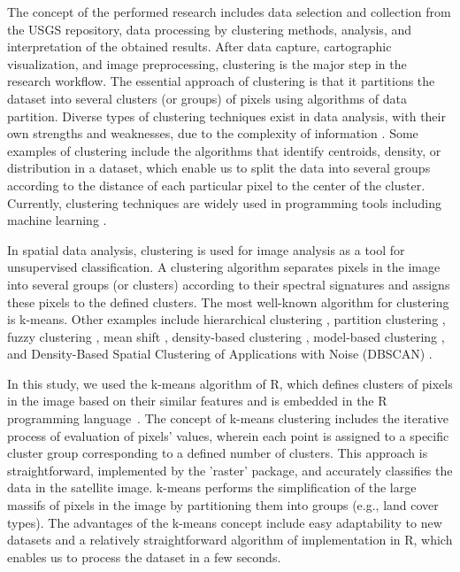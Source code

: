 \documentclass[information,article,accept,pdftex,moreauthors]{Definitions/mdpi}
\begin{document}
{The concept of the performed research includes data selection and collection from the USGS repository, data processing by clustering methods, analysis, and interpretation of the obtained results. After data capture, cartographic visualization, and image preprocessing, clustering is the major step in the research workflow. The essential approach of clustering is that it partitions the dataset into several clusters (or groups) of pixels using algorithms of data partition. Diverse types of clustering techniques exist in data analysis, with their own strengths and weaknesses, due to the complexity of information} \cite{XuTian}. {Some examples of clustering include the algorithms that identify centroids, density, or distribution in a dataset, which enable us to split the data into several groups according to the distance of each particular pixel to the center of the cluster. Currently, clustering techniques are widely used in programming tools including machine learning} \cite{CHANDER2023179}.

{In spatial data analysis, clustering is used for image analysis as a tool for unsupervised classification. A clustering algorithm separates pixels in the image into several groups (or clusters) according to their spectral signatures and assigns these pixels to the defined clusters. The most well-known algorithm for clustering is k-means. Other examples include hierarchical clustering} \cite{ZHIYING2023101935,XIE2023109230}, {partition clustering} \cite{ZEIN2023100731}, {fuzzy clustering} \cite{ROY2012452}, {mean shift} \cite{GUO201828,BECK2019128}, {density-based clustering} \cite{CHENG2023170,MAHESHWARI2023109341}, {model-based clustering} \cite{YOU2022107457}, and {Density-Based Spatial Clustering of Applications with Noise (DBSCAN)} \cite{OUYANG2022688,PRANATA2023319,WU202257}. 

{In this study, we used the k-means algorithm of R, which defines clusters of pixels in the image based on their similar features and is embedded in the R programming language}~\cite{FAVERO2023193}. {The concept of k-means clustering includes the iterative process of evaluation of pixels' values, wherein each point is assigned to a specific cluster group corresponding to a defined number of clusters. This approach is straightforward, implemented by the 'raster' package, and accurately classifies the data in the satellite image. k-means performs the simplification of the large massifs of pixels in the image by partitioning them into groups (e.g., land cover types). The advantages of the k-means concept include easy adaptability to new datasets and a relatively straightforward algorithm of implementation in R, which enables us to process the dataset in a few seconds.}
\end{document}
